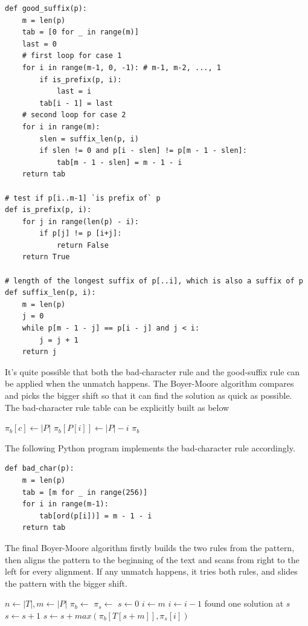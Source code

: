 \documentclass[UTF8]{article}
\begin{document}
\lstset{language=Python}
\begin{lstlisting}
def good_suffix(p):
    m = len(p)
    tab = [0 for _ in range(m)]
    last = 0
    # first loop for case 1
    for i in range(m-1, 0, -1): # m-1, m-2, ..., 1
        if is_prefix(p, i):
            last = i
        tab[i - 1] = last
    # second loop for case 2
    for i in range(m):
        slen = suffix_len(p, i)
        if slen != 0 and p[i - slen] != p[m - 1 - slen]:
            tab[m - 1 - slen] = m - 1 - i
    return tab

# test if p[i..m-1] `is prefix of` p
def is_prefix(p, i):
    for j in range(len(p) - i):
        if p[j] != p [i+j]:
            return False
    return True

# length of the longest suffix of p[..i], which is also a suffix of p
def suffix_len(p, i):
    m = len(p)
    j = 0
    while p[m - 1 - j] == p[i - j] and j < i:
        j = j + 1
    return j
\end{lstlisting}

It's quite possible that both the bad-character rule and the good-suffix rule can be applied
when the unmatch happens. The Boyer-Moore algorithm compares and picks the bigger shift
so that it can find the solution as quick as possible. The bad-character rule table can
be explicitly built as below

\begin{algorithmic}[1]
    \State $\pi_b[c] \gets |P|$
  \EndFor
    \State $\pi_b[P[i]] \gets |P| - i$
  \EndFor
  \State \Return $\pi_b$
\EndFunction
\end{algorithmic}

The following Python program implements the bad-character rule accordingly.

\lstset{language=Python}
\begin{lstlisting}
def bad_char(p):
    m = len(p)
    tab = [m for _ in range(256)]
    for i in range(m-1):
        tab[ord(p[i])] = m - 1 - i
    return tab
\end{lstlisting}

The final Boyer-Moore algorithm firstly builds the two rules from the pattern, then
aligns the pattern to the beginning of the text and scans from right to the left for
every alignment. If any unmatch happens, it tries both rules, and slides the pattern
with the bigger shift.

\begin{algorithmic}[1]
  \State $n \gets |T|, m \gets |P|$
  \State $\pi_b \gets$ 
  \State $\pi_s \gets$ 
  \State $s \gets 0$
    \State $i \gets m$
      \State $i \gets i - 1$
    \EndWhile
      \State found one solution at $s$
      \State $s \gets s + 1$ 
    \Else
      \State $s \gets s + max(\pi_b[T[s + m]], \pi_s[i])$
    \EndIf
  \EndWhile
\EndFunction
\end{algorithmic}
\end{document}
